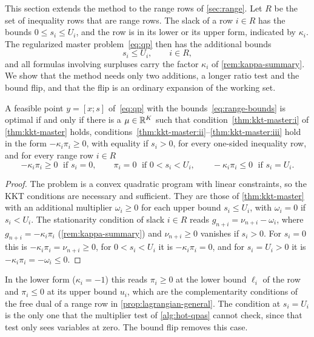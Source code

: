 This section extends the method to the range rows of \cref{sec:range}. Let $R$ be the set of
inequality rows that are range rows. The slack of a row $i\in R$ has the bounds
$0\le s_i\le U_i$, and the row is in its lower or its upper form, indicated by $\kappa_i$.
The regularized master problem~\eqref{eq:qp} then has the additional bounds
\begin{equation} \label{eq:range-bounds}
s_i\le U_i,\qquad i\in R,
\end{equation}
and all formulas involving surpluses carry the factor $\kappa_i$ of \cref{rem:kappa-summary}.
We show that the method needs only two additions, a longer ratio test and the bound flip, and
that the flip is an ordinary expansion of the working set.

\begin{theorem} \label{thm:kkt-range}
A feasible point $y = [x;s]$ of~\eqref{eq:qp} with the bounds~\eqref{eq:range-bounds} is
optimal if and only if there is a $\mu\in\mathbb{R}^K$ such that condition~\ref{thm:kkt-master:i} of
\cref{thm:kkt-master} holds, conditions~\ref{thm:kkt-master:ii}--\ref{thm:kkt-master:iii} hold
in the form $-\kappa_i\pi_i\ge0$, with equality if $s_i>0$, for every one-sided inequality
row, and for every range row $i\in R$
\[
-\kappa_i\pi_i\ge0 \;\text{ if } s_i = 0,\qquad
\pi_i = 0 \;\text{ if } 0<s_i<U_i,\qquad
-\kappa_i\pi_i\le0 \;\text{ if } s_i = U_i .
\]
\end{theorem}

\begin{proof}
The problem is a convex quadratic program with linear constraints, so the KKT conditions are
necessary and sufficient. They are those of \cref{thm:kkt-master} with an additional
multiplier $\omega_i\ge0$ for each upper bound $s_i\le U_i$, with $\omega_i = 0$ if $s_i<U_i$.
The stationarity condition of slack $i\in R$ reads $g_{n+i} = \nu_{n+i} - \omega_i$, where
$g_{n+i} = -\kappa_i\pi_i$ (\cref{rem:kappa-summary}) and $\nu_{n+i}\ge0$ vanishes if $s_i>0$.
For $s_i = 0$ this is $-\kappa_i\pi_i = \nu_{n+i}\ge0$, for $0<s_i<U_i$ it is $-\kappa_i\pi_i = 0$,
and for $s_i = U_i>0$ it is $-\kappa_i\pi_i = -\omega_i\le0$.
\end{proof}

In the lower form ($\kappa_i = -1$) this reads $\pi_i\ge0$ at the lower bound $\ell_i$ of the
row and $\pi_i\le0$ at its upper bound $u_i$, which are the complementarity conditions of the
free dual of a range row in \cref{prop:lagrangian-general}. The condition at $s_i = U_i$ is
the only one that the multiplier test of \cref{alg:hot-qpas} cannot check, since that test only
sees variables at zero. The bound flip removes this case.

